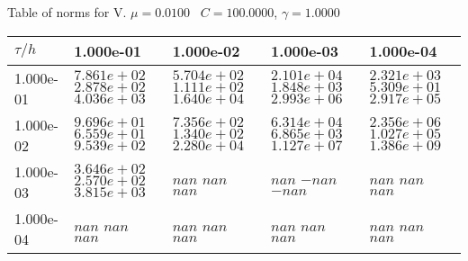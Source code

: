 \begin{center}
Table of norms for V. $\mu = 0.0100$ \, $C = 100.0000$, $\gamma = 1.0000$
  
\begin{tabular}{|p{1in}|p{1in}|p{1in}|p{1in}|p{1in}|} \hline
$\tau / h$ &1.000e-01 &1.000e-02 &1.000e-03 &1.000e-04 \\ \hline 
1.000e-01 & $7.861e+02$  $2.878e+02$  $4.036e+03$  & $5.704e+02$  $1.111e+02$  $1.640e+04$  & $2.101e+04$  $1.848e+03$  $2.993e+06$  & $2.321e+03$  $5.309e+01$  $2.917e+05$  \\ \hline 
1.000e-02 & $9.696e+01$  $6.559e+01$  $9.539e+02$  & $7.356e+02$  $1.340e+02$  $2.280e+04$  & $6.314e+04$  $6.865e+03$  $1.127e+07$  & $2.356e+06$  $1.027e+05$  $1.386e+09$  \\ \hline 
1.000e-03 & $3.646e+02$  $2.570e+02$  $3.815e+03$  & $nan$  $nan$  $nan$  & $nan$  $-nan$  $-nan$  & $nan$  $nan$  $nan$  \\ \hline 
1.000e-04 & $nan$  $nan$  $nan$  & $nan$  $nan$  $nan$  & $nan$  $nan$  $nan$  & $nan$  $nan$  $nan$  \\ \hline 

\end{tabular}\\[20pt]
\end{center}
